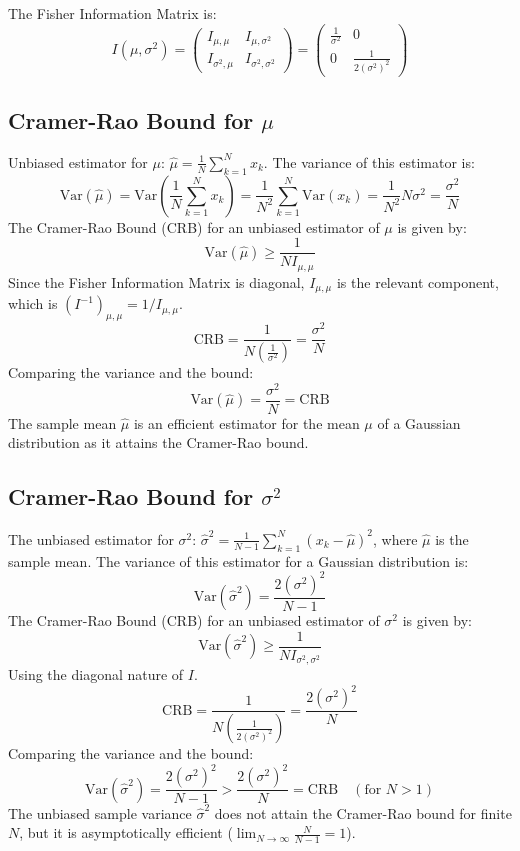 \documentclass{article}
\begin{document}
The Fisher Information Matrix is:
\[
I(\mu, \sigma^2) = 
\begin{pmatrix}
I_{\mu, \mu} & I_{\mu, \sigma^2} \\
I_{\sigma^2, \mu} & I_{\sigma^2, \sigma^2}
\end{pmatrix}
=
\begin{pmatrix}
\frac{1}{\sigma^2} & 0 \\
0 & \frac{1}{2(\sigma^2)^2}
\end{pmatrix}
\]

\subsection*{Cramer-Rao Bound for \(\mu\)}
Unbiased estimator for $\mu$: $\hat{\mu} = \frac{1}{N} \sum_{k=1}^N x_k$.
The variance of this estimator is:
\[
\text{Var}(\hat{\mu}) = \text{Var}\left(\frac{1}{N} \sum_{k=1}^N x_k\right) = \frac{1}{N^2} \sum_{k=1}^N \text{Var}(x_k) = \frac{1}{N^2} N \sigma^2 = \frac{\sigma^2}{N}
\]
The Cramer-Rao Bound (CRB) for an unbiased estimator of $\mu$ is given by:
\[
\text{Var}(\hat{\mu}) \ge \frac{1}{N I_{\mu, \mu}} 
\]
Since the Fisher Information Matrix is diagonal, $I_{\mu, \mu}$ is the relevant component, which is $(I^{-1})_{\mu, \mu} = 1/I_{\mu, \mu}$.
\[
\text{CRB} = \frac{1}{N \left(\frac{1}{\sigma^2}\right)} = \frac{\sigma^2}{N}
\]
Comparing the variance and the bound:
\[
\text{Var}(\hat{\mu}) = \frac{\sigma^2}{N} = \text{CRB}
\]
The sample mean $\hat{\mu}$ is an efficient estimator for the mean $\mu$ of a Gaussian distribution as it attains the Cramer-Rao bound.

\subsection*{Cramer-Rao Bound for \(\sigma^2\)}
The unbiased estimator for $\sigma^2$: $\hat{\sigma}^2 = \frac{1}{N-1} \sum_{k=1}^N (x_k - \hat{\mu})^2$, where $\hat{\mu}$ is the sample mean.
The variance of this estimator for a Gaussian distribution is:
\[
\text{Var}(\hat{\sigma}^2) = \frac{2(\sigma^2)^2}{N-1}
\]
The Cramer-Rao Bound (CRB) for an unbiased estimator of $\sigma^2$ is given by:
\[
\text{Var}(\hat{\sigma}^2) \ge \frac{1}{N I_{\sigma^2, \sigma^2}} 
\]
Using the diagonal nature of $I$.
\[
\text{CRB} = \frac{1}{N \left(\frac{1}{2(\sigma^2)^2}\right)} = \frac{2(\sigma^2)^2}{N}
\]
Comparing the variance and the bound:
\[
\text{Var}(\hat{\sigma}^2) = \frac{2(\sigma^2)^2}{N-1} > \frac{2(\sigma^2)^2}{N} = \text{CRB} \quad (\text{for } N>1)
\]
The unbiased sample variance $\hat{\sigma}^2$ does not attain the Cramer-Rao bound for finite $N$, but it is asymptotically efficient ($\lim_{N\to\infty} \frac{N}{N-1} = 1$).
\end{document}
